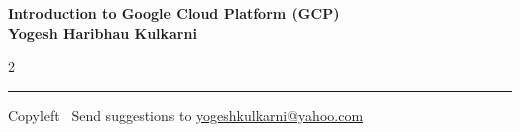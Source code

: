 \documentclass[8pt,landscape]{article}
\begin{document}
\footnotesize


\begin{center}
\Large{\textbf{Introduction to Google Cloud Platform (GCP)\\ Yogesh Haribhau Kulkarni}}  
\end{center}

\begin{multicols}{2}

\end{multicols}

\rule{\linewidth}{0.25pt}
\scriptsize
Copyleft \textcopyleft\  Send suggestions to 
\href{http://www.yogeshkulkarni.com}{yogeshkulkarni@yahoo.com}
\end{document}
